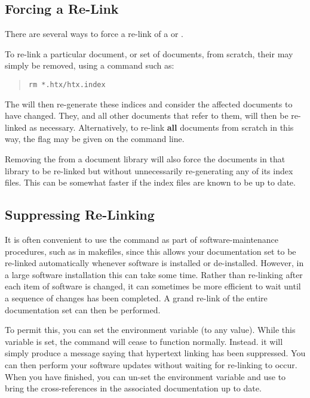 \subsection{Forcing a Re-Link}

There are several ways to force a re-link of a  or
.

To re-link a particular document, or set of documents, from scratch,
their  may simply be removed, using a command
such as:

\begin{quote}
\begin{verbatim}
rm *.htx/htx.index
\end{verbatim}
\end{quote}

The  will then re-generate these indices and
consider the affected documents to have changed. They, and all other
documents that refer to them, will then be re-linked as
necessary. Alternatively, to re-link {\bf all} documents from scratch
in this way, the  flag may be given on the  command
line.

Removing the 
from a document library will also force the documents in that library
to be re-linked but without unnecessarily re-generating any of its
index files.  This can be somewhat faster if the index files are known
to be up to date.

\subsection{\label{sect:suppressing}Suppressing Re-Linking}

It is often convenient to use the  command as
part of software-maintenance procedures, such as in makefiles, since
this allows your documentation set to be re-linked automatically
whenever software is installed or de-installed. However, in a large
software installation this can take some time. Rather than re-linking
after each item of software is changed, it can sometimes be more
efficient to wait until a sequence of changes has been completed. A
grand re-link of the entire documentation set can then be performed.

To permit this, you can set the  environment variable
(to any value). While this variable is set, the  command
will cease to function normally. Instead. it will simply produce a
message saying that hypertext linking has been suppressed. You can
then perform your software updates without waiting for re-linking to
occur. When you have finished, you can un-set the 
environment variable and use  to bring the cross-references
in the associated documentation up to date.

